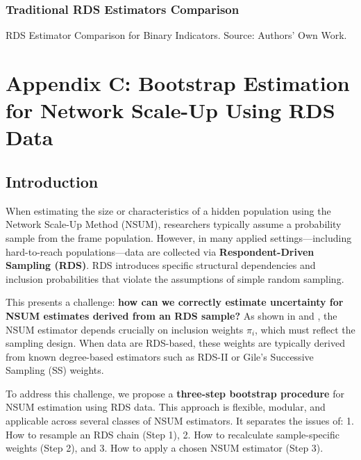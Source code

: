 \documentclass[
  12pt,
  letterpaper,
  DIV=11,
  numbers=noendperiod]{scrartcl}
\theoremstyle{plain}
\theoremstyle{definition}
\begin{document}
\subsubsection{Traditional RDS Estimators
Comparison}\label{traditional-rds-estimators-comparison}

\begin{table}

\caption{\label{tbl-rds-comparison}RDS Estimator Comparison for Binary
Indicators. Source: Authors' Own Work.}


\end{table}%

\section{Appendix C: Bootstrap Estimation for Network Scale-Up Using RDS
Data}\label{app-3step}

\subsection{Introduction}\label{introduction-1}

When estimating the size or characteristics of a hidden population using
the Network Scale-Up Method (NSUM), researchers typically assume a
probability sample from the frame population. However, in many applied
settings---including hard-to-reach populations---data are collected via
\textbf{Respondent-Driven Sampling (RDS)}. RDS introduces specific
structural dependencies and inclusion probabilities that violate the
assumptions of simple random sampling.

This presents a challenge: \textbf{how can we correctly estimate
uncertainty for NSUM estimates derived from an RDS sample?} As shown in
\textcite{feeh16-generali} and \textcite{salg06-variance}, the NSUM
estimator depends crucially on inclusion weights \(\pi_i\), which must
reflect the sampling design. When data are RDS-based, these weights are
typically derived from known degree-based estimators such as RDS-II or
Gile's Successive Sampling (SS) weights.

To address this challenge, we propose a \textbf{three-step bootstrap
procedure} for NSUM estimation using RDS data. This approach is
flexible, modular, and applicable across several classes of NSUM
estimators. It separates the issues of: 1. How to resample an RDS chain
(Step 1), 2. How to recalculate sample-specific weights (Step 2), and 3.
How to apply a chosen NSUM estimator (Step 3).
\end{document}
